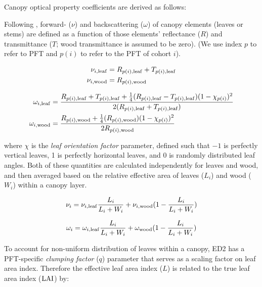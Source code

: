 Canopy optical property coefficients are derived as follows:

Following \citet{clm45_note}, forward- ($\nu$) and backscattering ($\omega$) of canopy elements (leaves or stems) are defined as a function of those elements' reflectance ($R$) and transmittance ($T$; wood transmittance is assumed to be zero).
(We use index $p$ to refer to PFT and $p(i)$ to refer to the PFT of cohort $i$).

\begin{align}
  \begin{split}
    \nu_{i, \mathrm{leaf}} &= R_{p(i), \mathrm{leaf}} + T_{p(i), \mathrm{leaf}}\\
    \nu_{i, \mathrm{wood}} &= R_{p(i), \mathrm{wood}}\\
  \end{split}
\end{align}

\begin{align}
  \begin{split}
    \omega_{i, \mathrm{leaf}} &= \frac{R_{p(i), \mathrm{leaf}} + T_{p(i), \mathrm{leaf}} + \frac{1}{4} (R_{p(i), \mathrm{leaf}}-T_{p(i), \mathrm{leaf}})(1 - \chi_{p(i)})^2}{2 (R_{p(i), \mathrm{leaf}}+T_{p(i), \mathrm{leaf}})}\\
    \omega_{i, \mathrm{wood}} &= \frac{R_{p(i), \mathrm{wood}} + \frac{1}{4} (R_{p(i), \mathrm{wood}})(1 - \chi_{p(i)})^2}{2 R_{p(i), \mathrm{wood}}}
  \end{split}
\end{align}

where $\chi$ is the \emph{leaf orientation factor} parameter, defined such that $-1$ is perfectly vertical leaves, 1 is perfectly horizontal leaves, and 0 is randomly distributed leaf angles.
Both of these quantities are calculated independently for leaves and wood, and then averaged based on the relative effective area of leaves ($L_{i}$) and wood ($W_{i}$) within a canopy layer.

\begin{equation}
  \nu_{i} = \nu_{i, \mathrm{leaf}} \frac{L_{i}}{L_{i} + W_{i}} + \nu_{i, \mathrm{wood}} (1 - \frac{L_{i}}{L_{i} + W_{i}})
\end{equation}

\begin{equation}
  \omega_{i} = \omega_{i, \mathrm{leaf}} \frac{L_{i}}{L_{i} + W_{i}} + \omega_{\mathrm{wood}} (1 - \frac{L_{i}}{L_{i} + W_{i}})
\end{equation}

To account for non-uniform distribution of leaves within a canopy, ED2 has a PFT-specific \emph{clumping factor} ($q$) parameter that serves as a scaling factor on leaf area index.
Therefore the effective leaf area index ($L$) is related to the true leaf area index ($\mathrm{LAI}$) by:

